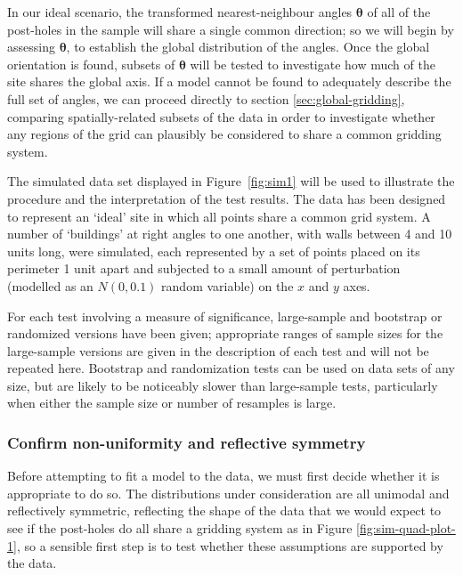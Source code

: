 \documentclass[../../ArchStats.tex]{subfiles}
\begin{document}

In our ideal scenario, the transformed nearest-neighbour angles $\boldsymbol{\theta}$ of all of the post-holes in the sample will share a single common direction; so we will begin by assessing $\boldsymbol{\theta}$, to establish the global distribution of the angles. Once the global orientation is found, subsets of $\boldsymbol{\theta}$ will be tested to investigate how much of the site shares the global axis. If a model cannot be found to adequately describe the full set of angles, we can proceed directly to section \ref{sec:global-gridding}, comparing spatially-related subsets of the data in order to investigate whether any regions of the grid can plausibly be considered to share a common gridding system.

The simulated data set displayed in Figure~\ref{fig:sim1} will be used to illustrate the procedure and the interpretation of the test results. The data has been designed to represent an `ideal' site in which all points share a common grid system. A number of `buildings' at right angles to one another, with walls between 4 and 10 units long, were simulated, each represented by a set of points placed on its perimeter 1 unit apart and subjected to a small amount of perturbation (modelled as an $N(0,0.1)$ random variable) on the $x$ and $y$ axes.

For each test involving a measure of significance, large-sample and bootstrap or randomized versions have been given; appropriate ranges of sample sizes for the large-sample versions are given in the description of each test and will not be repeated here. Bootstrap and randomization tests can be used on data sets of any size, but are likely to be noticeably slower than large-sample tests, particularly when either the sample size or number of resamples is large. 


\subsubsection{Confirm non-uniformity and reflective symmetry}
\label{sssec:unif-test}
Before attempting to fit a model to the data, we must first decide whether it is appropriate to do so. The distributions under consideration are all unimodal and reflectively symmetric, reflecting the shape of the data that we would expect to see if the post-holes do all share a gridding system as in Figure \ref{fig:sim-quad-plot-1}, so a sensible first step is to test whether these assumptions are supported by the data. 
\end{document}
